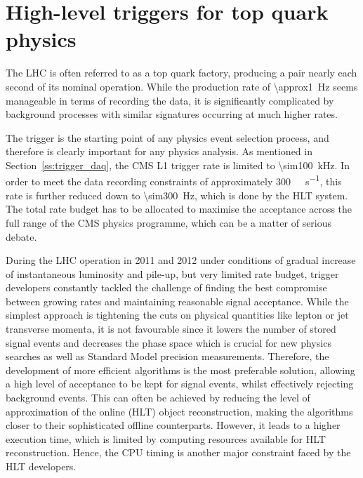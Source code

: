 
\chapter[High-level triggers for top quark physics]{High-level triggers for top quark physics}
\label{c:service_work}
\ifpdf
    \graphicspath{{04_Service_work/plots/}}
\else
    \graphicspath{{04_Service_work/plots/EPS/}{04_Service_work/plots/}}
\fi

The LHC is often referred to as a top quark factory, producing a \ttbar pair nearly each second of its nominal
operation. While the production rate of \SI{\approx1}{\Hz} seems manageable in terms of recording the data, it is
significantly complicated by background processes with similar signatures occurring at much higher rates.

The trigger is the starting point of any physics event selection process, and therefore is clearly important for any
physics analysis. As mentioned in Section~\ref{ss:trigger_daq}, the CMS L1 trigger rate is limited to
\SI{\sim100}{\kilo\hertz}. In order to meet the data recording constraints of approximately
\SI{300}{\mega\byte\per\second}, this rate is further reduced down to \SI{\sim300}{\Hz}, which is done by the HLT
system. The total rate budget has to be allocated to maximise the acceptance across the full range of the CMS physics
programme, which can be a matter of serious debate.

During the LHC operation in 2011 and 2012 under conditions of gradual increase of instantaneous luminosity and pile-up,
but very limited rate budget, trigger developers constantly tackled the challenge of finding the best compromise between
growing rates and maintaining reasonable signal acceptance. While the simplest approach is tightening the cuts on
physical quantities like lepton or jet transverse momenta, it is not favourable since it lowers the number of stored
signal events and decreases the phase space which is crucial for new physics searches as well as Standard Model
precision measurements. Therefore, the development of more efficient algorithms is the most preferable solution,
allowing a high level of acceptance to be kept for signal events, whilst effectively rejecting background events. This
can often be achieved by reducing the level of approximation of the online (HLT) object reconstruction, making the
algorithms closer to their sophisticated offline counterparts. However, it leads to a higher execution time, which is
limited by computing resources available for HLT reconstruction. Hence, the CPU timing is another major constraint faced
by the HLT developers.

